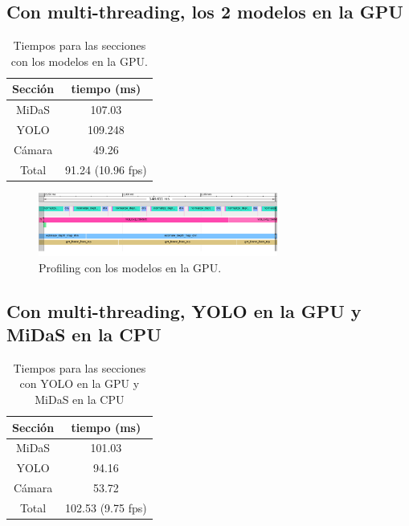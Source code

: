         \subsection{Con multi-threading, los 2 modelos en la GPU}
\begin{table}[H]
    \centering
    \begin{tabular}{|c|c|}
        \hline
        \textbf{Sección} & \textbf{tiempo (ms)}  \\
        \hline
        MiDaS   & 107.03     \\
        YOLO    & 109.248    \\
        Cámara  & 49.26   \\
        Total   & 91.24 (10.96 fps)    \\

        \hline
    \end{tabular}
    \caption{Tiempos para las secciones con los modelos en la GPU.}
    \label{tab:gpu2}
\end{table}


\begin{figure}[H]
    \centering
    \includegraphics[width=0.7\textwidth]{images/2gpu_prof.png}
    \caption{Profiling con los modelos en la GPU.}
    \label{fig:gpu2_prof}
\end{figure}

        \subsection{Con multi-threading, YOLO en la GPU y MiDaS en la CPU}
\begin{table}[H]
    \centering
    \begin{tabular}{|c|c|}
        \hline
        \textbf{Sección} & \textbf{tiempo (ms)}  \\
        \hline
        MiDaS   & 101.03     \\
        YOLO    & 94.16    \\
        Cámara  & 53.72   \\
        Total   & 102.53 (9.75 fps)    \\

        \hline
    \end{tabular}
    \caption{Tiempos para las secciones con YOLO en la GPU y MiDaS en la CPU}
    \label{tab:yologpu_midas_cpu}
\end{table}


